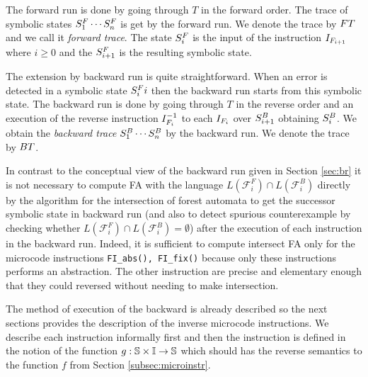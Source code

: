 The forward run is done by going through $T$ in the forward order.
The trace of symbolic states $S^{F}_1 \cdots S^{F}_n$ is get by the forward run.
We denote the trace by $FT$ and we call it \emph{forward trace}.
The state $S^{F}_{i}$ is the input of the instruction $I_{F_{i+1}}$
where $i \geq 0$ and the $S^{F}_{i+1}$ is the resulting symbolic state. 

The extension by backward run is quite straightforward.
When an error is detected in a symbolic state $S^{F}_{i}{i}$
then the backward run starts from this symbolic state.
The backward run is done by going through $T$ in the reverse order
and an execution of the reverse instruction $I_{F_{i}}^{-1}$ to each $I_{F_{i}}$
over $S^{B}_{i+1}$ obtaining $S^{B}_{i}$.
We obtain the \emph{backward trace} $S^{B}_1 \cdots S^{B}_n$ by the backward run.
We denote the trace by $BT$.

In contrast to the conceptual view of the backward run given in Section \ref{sec:br}
it is not necessary to compute FA with the language
$L(\mathcal{F}_i^F) \cap L(\mathcal{F}_i^B)$ directly
by the algorithm for the intersection of forest automata to get the successor
symbolic state in backward run (and also to detect spurious counterexample
by checking whether $L(\mathcal{F}_i^F) \cap L(\mathcal{F}_i^B) = \emptyset$)
after the execution of each instruction in the backward run.
Indeed, it is sufficient to compute intersect FA only for
the microcode instructions {\tt FI\_abs(), FI\_fix()}
because only these instructions performs an abstraction.
The other instruction are precise and elementary enough
that they could reversed without needing to make intersection.

The method of execution of the backward is already described so
the next sections provides the description of the inverse microcode instructions.
We describe each instruction informally first and then the instruction is defined in the notion
of the function $g: \mathbb{S} \times \mathbb{I} \rightarrow \mathbb{S}$ which should has the reverse semantics
to the function $f$ from Section \ref{subsec:microinstr}.

